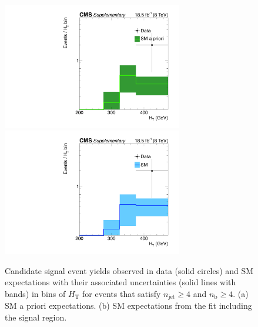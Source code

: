 \clearpage
\begin{figure}[h!]
  \begin{center}
    \includegraphics[width=0.7\textwidth]{ge4b_ge4j_prefit_log} 
    \includegraphics[width=0.7\textwidth]{ge4b_ge4j_postfit_log} \\
    \caption{Candidate signal event yields observed in data (solid
      circles) and SM expectations with their associated uncertainties
      (solid lines with bands) in bins of $H_\text{T}$ for events that
      satisfy $n_\text{jet} \geq 4$ and $n_\text{b} \geq 4$. (a) SM a
      priori expectations. (b) SM expectations from the fit including
      the signal region. }
  \end{center}
\end{figure}

